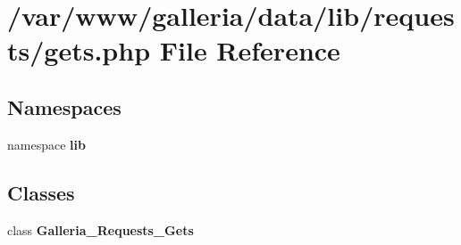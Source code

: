 \section{/var/www/galleria/data/lib/requests/gets.php File Reference}
\label{gets_8php}
\subsection*{Namespaces}
\begin{CompactItemize}
\item 
namespace {\bf lib}
\end{CompactItemize}
\subsection*{Classes}
\begin{CompactItemize}
\item 
class {\bf Galleria\_\-Requests\_\-Gets}
\end{CompactItemize}
